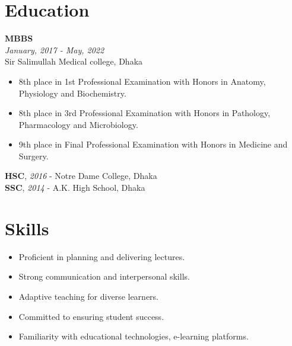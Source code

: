 \documentclass[a4paper,12pt]{article}
\newcommand{\resumeentry}[2]{
    \textbf{#1} \\
    \textit{#2}
}
\begin{document}
\begin{minipage}[t][9.8cm]{0.6\textwidth}
\raggedright
\section*{Education}
\resumeentry{MBBS}{January, 2017 - May, 2022}\\ Sir Salimullah Medical college, Dhaka
\begin{itemize}[left=0em, itemsep=0pt, parsep=0pt]
	\item 8th place in 1st Professional Examination with Honors in Anatomy, Physiology and Biochemistry.
	\item 8th place in 3rd Professional Examination with Honors in Pathology, Pharmacology and Microbiology.
	\item 9th place in Final Professional Examination with Honors in Medicine and Surgery.
\end{itemize}
\textbf{HSC}, \textit{2016} - Notre Dame College, Dhaka \\
\textbf{SSC}, \textit{2014} - A.K. High School, Dhaka \\
\end{minipage}
\hspace{0.5cm}\hspace{0.5cm}
\begin{minipage}[t][9.8cm]{0.32\textwidth}
\raggedright
\section*{Skills}
\begin{itemize}[left=0em, itemsep=0pt, parsep=0pt]
  \item Proficient in planning and delivering lectures.
  \item Strong communication and interpersonal skills.
  \item Adaptive teaching for diverse learners.
  \item Committed to ensuring student success.
  \item Familiarity with educational technologies, e-learning platforms.
\end{itemize}

\end{minipage}
\end{document}

